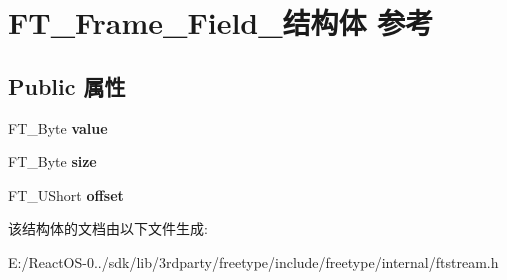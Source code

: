 \hypertarget{struct_f_t___frame___field__}{}\section{F\+T\+\_\+\+Frame\+\_\+\+Field\+\_\+结构体 参考}
\label{struct_f_t___frame___field__}
\subsection*{Public 属性}
\begin{DoxyCompactItemize}
\item 
\mbox{\label{struct_f_t___frame___field___a10f91dcdd0a582727b67ad45d42bab41}} 
F\+T\+\_\+\+Byte {\bfseries value}
\item 
\mbox{\label{struct_f_t___frame___field___a47e6fbcb90c079421d9d9b64f63a587e}} 
F\+T\+\_\+\+Byte {\bfseries size}
\item 
\mbox{\label{struct_f_t___frame___field___a85c3275fbb7044f7d6880020b6f0f794}} 
F\+T\+\_\+\+U\+Short {\bfseries offset}
\end{DoxyCompactItemize}


该结构体的文档由以下文件生成\+:\begin{DoxyCompactItemize}
\item 
E\+:/\+React\+O\+S-\/0../sdk/lib/3rdparty/freetype/include/freetype/internal/ftstream.\+h\end{DoxyCompactItemize}
